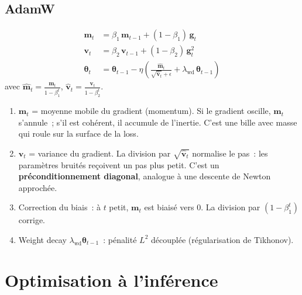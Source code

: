 \documentclass[11pt,a4paper]{article}
\begin{document}
\subsection{AdamW}

\begin{align}
  \mathbf{m}_t &= \beta_1\,\mathbf{m}_{t-1} + (1 - \beta_1)\,\mathbf{g}_t  \\
  \mathbf{v}_t &= \beta_2\,\mathbf{v}_{t-1} + (1 - \beta_2)\,\mathbf{g}_t^2  \\
  \bm{\theta}_t &= \bm{\theta}_{t-1} - \eta\!\left(\frac{\hat{\mathbf{m}}_t}{\sqrt{\hat{\mathbf{v}}_t} + \epsilon} + \lambda_{\text{wd}}\,\bm{\theta}_{t-1}\right)
\end{align}
avec $\hat{\mathbf{m}}_t = \frac{\mathbf{m}_t}{1 - \beta_1^t}$, $\hat{\mathbf{v}}_t = \frac{\mathbf{v}_t}{1 - \beta_2^t}$.

\begin{intubox}
\begin{enumerate}[leftmargin=1.5em]
  \item $\mathbf{m}_t$ = moyenne mobile du gradient (momentum). Si le gradient oscille, $\mathbf{m}_t$ s'annule~; s'il est coh\'erent, il accumule de l'inertie. C'est une bille avec masse qui roule sur la surface de la loss.

  \item $\mathbf{v}_t$ = variance du gradient. La division par $\sqrt{\hat{\mathbf{v}}_t}$ normalise le pas~: les param\`etres bruit\'es re\c{c}oivent un pas plus petit. C'est un \textbf{pr\'econditionnement diagonal}, analogue \`a une descente de Newton approch\'ee.

  \item Correction du biais~: \`a $t$ petit, $\mathbf{m}_t$ est biais\'e vers 0. La division par $(1-\beta_1^t)$ corrige.

  \item Weight decay $\lambda_{\text{wd}} \bm{\theta}_{t-1}$~: p\'enalit\'e $L^2$ d\'ecoupl\'ee (r\'egularisation de Tikhonov).
\end{enumerate}
\end{intubox}

\section{Optimisation \`a l'inf\'erence}
\end{document}
